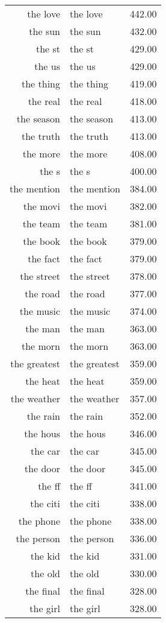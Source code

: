 \begin{table}[ht]
\begin{tabular}{rlr}
  the love & the love & 442.00 \\ 
  the sun & the sun & 432.00 \\ 
  the st & the st & 429.00 \\ 
  the us & the us & 429.00 \\ 
  the thing & the thing & 419.00 \\ 
  the real & the real & 418.00 \\ 
  the season & the season & 413.00 \\ 
  the truth & the truth & 413.00 \\ 
  the more & the more & 408.00 \\ 
  the s & the s & 400.00 \\ 
  the mention & the mention & 384.00 \\ 
  the movi & the movi & 382.00 \\ 
  the team & the team & 381.00 \\ 
  the book & the book & 379.00 \\ 
  the fact & the fact & 379.00 \\ 
  the street & the street & 378.00 \\ 
  the road & the road & 377.00 \\ 
  the music & the music & 374.00 \\ 
  the man & the man & 363.00 \\ 
  the morn & the morn & 363.00 \\ 
  the greatest & the greatest & 359.00 \\ 
  the heat & the heat & 359.00 \\ 
  the weather & the weather & 357.00 \\ 
  the rain & the rain & 352.00 \\ 
  the hous & the hous & 346.00 \\ 
  the car & the car & 345.00 \\ 
  the door & the door & 345.00 \\ 
  the ff & the ff & 341.00 \\ 
  the citi & the citi & 338.00 \\ 
  the phone & the phone & 338.00 \\ 
  the person & the person & 336.00 \\ 
  the kid & the kid & 331.00 \\ 
  the old & the old & 330.00 \\ 
  the final & the final & 328.00 \\ 
  the girl & the girl & 328.00 \\ 

\end{tabular}
\end{table}
